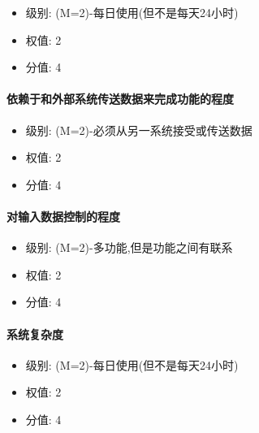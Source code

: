 \documentclass[hyperref, a4paper]{ctexart}
\providecommand{\tightlist}{%
  \setlength{\itemsep}{0pt}\setlength{\parskip}{0pt}}
\let\oldparagraph\paragraph
\renewcommand{\paragraph}[1]{\oldparagraph{#1}\mbox{}}
\begin{document}
\begin{itemize}
\tightlist
\item
  级别: (M=2)-每日使用(但不是每天24小时)
\item
  权值: 2
\item
  分值: 4
\end{itemize}

\hypertarget{ux4f9dux8d56ux4e8eux548cux5916ux90e8ux7cfbux7edfux4f20ux9001ux6570ux636eux6765ux5b8cux6210ux529fux80fdux7684ux7a0bux5ea6}{%
\paragraph{依赖于和外部系统传送数据来完成功能的程度}\label{ux4f9dux8d56ux4e8eux548cux5916ux90e8ux7cfbux7edfux4f20ux9001ux6570ux636eux6765ux5b8cux6210ux529fux80fdux7684ux7a0bux5ea6}}

\begin{itemize}
\tightlist
\item
  级别: (M=2)-必须从另一系统接受或传送数据
\item
  权值: 2
\item
  分值: 4
\end{itemize}

\hypertarget{ux5bf9ux8f93ux5165ux6570ux636eux63a7ux5236ux7684ux7a0bux5ea6}{%
\paragraph{对输入数据控制的程度}\label{ux5bf9ux8f93ux5165ux6570ux636eux63a7ux5236ux7684ux7a0bux5ea6}}

\begin{itemize}
\tightlist
\item
  级别: (M=2)-多功能,但是功能之间有联系
\item
  权值: 2
\item
  分值: 4
\end{itemize}

\hypertarget{ux7cfbux7edfux590dux6742ux5ea6}{%
\paragraph{系统复杂度}\label{ux7cfbux7edfux590dux6742ux5ea6}}

\begin{itemize}
\tightlist
\item
  级别: (M=2)-每日使用(但不是每天24小时)
\item
  权值: 2
\item
  分值: 4
\end{itemize}
\end{document}
